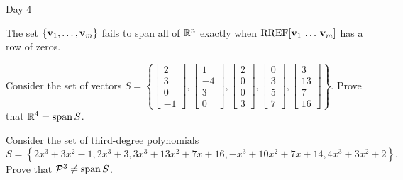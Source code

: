 \begin{applicationActivities}{Day 4}
\begin{fact}
  The set \(\{\mathbf v_1,\dots,\mathbf v_m\}\) fails to span all of \(\mathbb{R}^n\)
  exactly when \(\operatorname{RREF}[\mathbf v_1\,\dots\,\mathbf v_m]\) has a row of zeros.
\end{fact}

\begin{activity}{5}
  Consider the set of vectors \(S=\left\{
  \begin{bmatrix}2\\3\\0\\-1\end{bmatrix},
  \begin{bmatrix}1\\-4\\3\\0\end{bmatrix},
  \begin{bmatrix}2\\0\\0\\3\end{bmatrix},
  \begin{bmatrix}0\\3\\5\\7\end{bmatrix},
  \begin{bmatrix}3\\13\\7\\16\end{bmatrix}
  \right\}
  \).
  Prove that
  \(\mathbb{R}^4=\operatorname{span} S\).
\end{activity}

\begin{activity}{10}
  Consider the set of third-degree polynomials \[S=\left\{
  2x^3+3x^2-1,
  2x^3+3,
  3x^3+13x^2+7x+16,
  -x^3+10x^2+7x+14,
  4x^3+3x^2+2
  \right\}
  .\]
  Prove that
  \(\mathcal{P}^3\not=\operatorname{span} S\).
\end{activity}


\end{applicationActivities}
